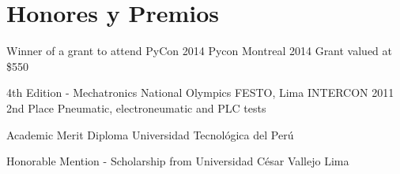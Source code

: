 \section{Honores y Premios}

{Winner of a grant to attend PyCon 2014}
{Pycon}
{Montreal 2014}
{}
{Grant valued at \$550}

{4th Edition - Mechatronics National Olympics}
{FESTO, Lima}
{INTERCON 2011}
{2nd Place}
{Pneumatic, electroneumatic and PLC tests}  

{Academic Merit Diploma}
{Universidad Tecnológica del Perú}{}{}
{}  

{Honorable Mention - Scholarship from Universidad César Vallejo}
{Lima}
{}{}
{}  